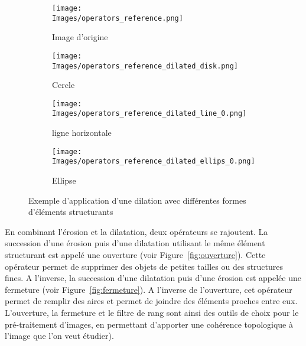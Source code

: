 \documentclass[\main/main.tex]{subfiles}
\providecommand{\Images}{\main/Figures/intro_seg}
\begin{document}
\begin{figure}[h]
    \centering
    \begin{subfigure}[b]{0.45\textwidth}
       \caption{
       Image d'origine
            }
       \centering \texttt{[image: \\Images/operators\_reference.png]}
    \end{subfigure}
    \begin{subfigure}[b]{0.45\textwidth}
       \caption{
       Cercle
            }
       \centering \texttt{[image: \\Images/operators\_reference\_dilated\_disk.png]}
    \end{subfigure}
    \begin{subfigure}[b]{0.45\textwidth}
       \caption{
       ligne horizontale
            }
       \centering \texttt{[image: \\Images/operators\_reference\_dilated\_line\_0.png]}
    \end{subfigure}
    \begin{subfigure}[b]{0.45\textwidth}
       \caption{
       Ellipse
            }
       \centering \texttt{[image: \\Images/operators\_reference\_dilated\_ellips\_0.png]}
    \end{subfigure}
    \caption{
        \label{fig:morpho:operateurs}
        Exemple d'application d'une dilation avec différentes formes d'éléments structurants
    }
    
\end{figure}
%
%
En combinant l'érosion et la dilatation, deux opérateurs se rajoutent.
%
La succession d'une érosion puis d'une dilatation utilisant le même élément structurant
est appelé une ouverture
(voir Figure~\ref{fig:ouverture}).
%
Cette opérateur permet de supprimer des objets de petites tailles ou des structures fines.
%
A l'inverse, la succession d'une dilatation puis d'une érosion est appelée une fermeture
(voir Figure~\ref{fig:fermeture}).
%
A l'inverse de l'ouverture, cet opérateur permet de remplir des aires et permet de joindre des éléments proches entre eux.
%
L'ouverture, la fermeture et le filtre de rang sont ainsi des outils de choix pour le pré\hyp{}traitement d'images, en permettant d'apporter une cohérence topologique à l'image que l'on veut étudier).
\end{document}
